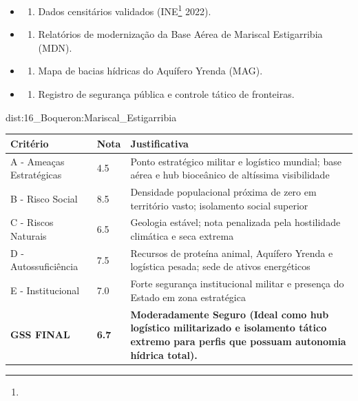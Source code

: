 {\begin{itemize}
\tightlist
\item
  \begin{enumerate}
  \def\labelenumi{\arabic{enumi})}
  \tightlist
  \item
    Dados censitários validados (INE\footnote{\fineINE} 2022).
  \end{enumerate}
\item
  \begin{enumerate}
  \def\labelenumi{\arabic{enumi})}
  \setcounter{enumi}{1}
  \tightlist
  \item
    Relatórios de modernização da Base Aérea de Mariscal Estigarribia
    (MDN).
  \end{enumerate}
\item
  \begin{enumerate}
  \def\labelenumi{\arabic{enumi})}
  \setcounter{enumi}{2}
  \tightlist
  \item
    Mapa de bacias hídricas do Aquífero Yrenda (MAG).
  \end{enumerate}
\item
  \begin{enumerate}
  \def\labelenumi{\arabic{enumi})}
  \setcounter{enumi}{3}
  \tightlist
  \item
    Registro de segurança pública e controle tático de fronteiras.
  \end{enumerate}
\end{itemize}}{dist:16_Boqueron:Mariscal_Estigarribia}
\begin{table}[ht!]
\small \begin{tabular}{p{3.0cm}p{0.8cm}p{6.0cm}} \toprule
\textbf{Critério} & \textbf{Nota} & \textbf{Justificativa} \\ \midrule
A - Ameaças Estratégicas & 4.5 & Ponto estratégico militar e logístico mundial; base aérea e hub bioceânico de altíssima visibilidade \\
B - Risco Social & 8.5 & Densidade populacional próxima de zero em território vasto; isolamento social superior \\
C - Riscos Naturais & 6.5 & Geologia estável; nota penalizada pela hostilidade climática e seca extrema \\
D - Autossuficiência & 7.5 & Recursos de proteína animal, Aquífero Yrenda e logística pesada; sede de ativos energéticos \\
E - Institucional & 7.0 & Forte segurança institucional militar e presença do Estado em zona estratégica \\
\midrule \textbf{GSS FINAL} & \textbf{6.7} & \textbf{Moderadamente Seguro (Ideal como hub logístico militarizado e isolamento tático extremo para perfis que possuam autonomia hídrica total).} \\ \bottomrule \end{tabular}
\end{table}
